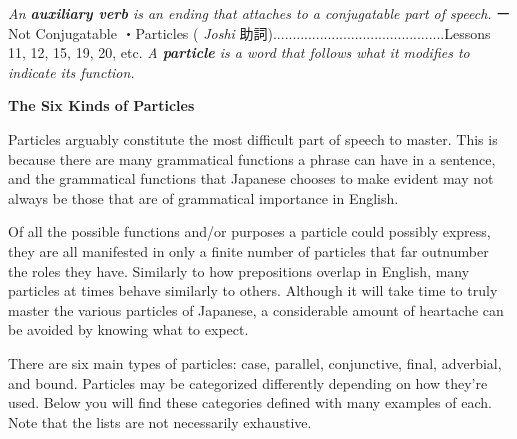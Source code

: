 \begin{itemize}
 \emph{An \textbf{auxiliary verb }is an ending that attaches to a conjugatable part of speech. }\hfill\break
\hfill\break
ー Not Conjugatable \hfill\break
\hfill\break
・Particles ( \emph{Joshi }助詞)\dothyp{}\dothyp{}\dothyp{}\dothyp{}\dothyp{}\dothyp{}\dothyp{}\dothyp{}\dothyp{}\dothyp{}\dothyp{}\dothyp{}\dothyp{}\dothyp{}\dothyp{}\dothyp{}\dothyp{}\dothyp{}\dothyp{}\dothyp{}\dothyp{}\dothyp{}\dothyp{}\dothyp{}\dothyp{}\dothyp{}\dothyp{}\dothyp{}\dothyp{}\dothyp{}\dothyp{}\dothyp{}\dothyp{}\dothyp{}\dothyp{}\dothyp{}\dothyp{}\dothyp{}\dothyp{}\dothyp{}\dothyp{}\dothyp{}..Lessons 11, 12, 15, 19, 20, etc. \hfill\break
 \emph{A \textbf{particle }is a word that follows what it modifies to indicate its function. }
\end{itemize}

\begin{center}
\textbf{The Six Kinds of Particles } 
\end{center}

\par{ Particles arguably constitute the most difficult part of speech to master. This is because there are many grammatical functions a phrase can have in a sentence, and the grammatical functions that Japanese chooses to make evident may not always be those that are of grammatical importance in English. }

\par{ Of all the possible functions and\slash or purposes a particle could possibly express, they are all manifested in only a finite number of particles that far outnumber the roles they have. Similarly to how prepositions overlap in English, many particles at times behave similarly to others. Although it will take time to truly master the various particles of Japanese, a considerable amount of heartache can be avoided by knowing what to expect. }

\par{ There are six main types of particles: case, parallel, conjunctive, final, adverbial, and bound. Particles may be categorized differently depending on how they're used. Below you will find these categories defined with many examples of each. Note that the lists are not necessarily exhaustive. }

